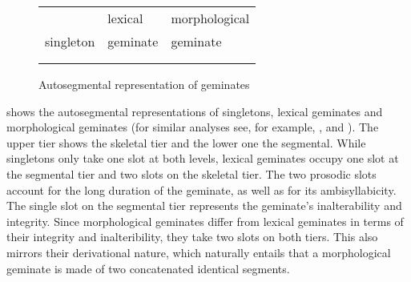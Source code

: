 \begin{figure}[h]
	\centering	
	
	\begin{tabularx}{.8\linewidth}{YYY}
		
		&		lexical			 & 		 morphological \\
		
		singleton	&			  geminate	 & 			  geminate\\		
		\\

		\begin{tikzpicture}[grow'=up]
		\Tree [.C C ] 					
		\end{tikzpicture}												&
		
		
		\begin{tikzpicture}[grow'=up]
		\Tree  [.C C C ];
		\end{tikzpicture}			
		&
		
		\begin{tikzpicture}[grow'=up]
		\Tree  [.C C ]
		\end{tikzpicture}
		\begin{tikzpicture}[grow'=up]
		\Tree  [.C C ]
		\end{tikzpicture}		
		
	\end{tabularx}
	
	\caption{Autosegmental representation of geminates}
	 \label{fig:Autosegmental representation of geminates} 

\end{figure}

 shows the autosegmental representations of singletons,  lexical geminates and  morphological geminates (for similar analyses see, for example,  \citealt[413]{Kenstowicz.1994}, \citealt[26 f.]{Gussmann.2002} and \citealt[62]{Ridouane.2010}). The upper tier shows the skeletal tier and the lower one the segmental. While singletons only take one slot at both levels,  lexical geminates occupy one slot at the segmental tier and two slots on the skeletal tier. The two prosodic slots account for the long duration of the geminate, as well as for its ambisyllabicity. The single slot on the segmental tier represents the {geminate's} inalterability and integrity. Since  morphological geminates differ from  lexical geminates in terms of their integrity and inalteribility, they take two slots on both tiers. This also mirrors their derivational nature, which naturally entails that a {morphological geminate} is made of two concatenated identical segments.


